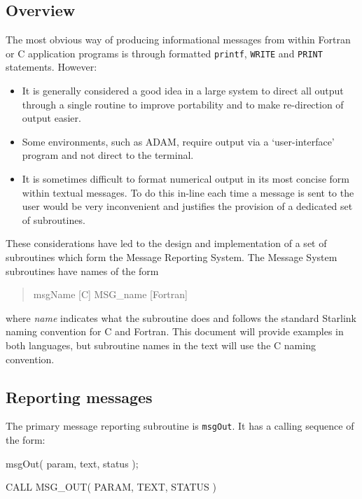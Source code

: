 \documentclass[twoside,11pt]{starlink}
\providecommand{\func}[1]{\texttt{#1}}
\providecommand{\farg}[1]{\textit{#1}}
\providecommand{\msgout}{\func{msgOut}}
\begin{document}
\subsection{Overview}

The most obvious way of producing informational messages from within
Fortran or C application programs is through formatted \func{printf},
\func{WRITE} and \func{PRINT}
statements.
However:
\begin{itemize}
\item It is generally considered a good idea in a large system to direct
all output through a single routine to improve portability and to make
re-direction of output easier.
\item Some environments, such as ADAM, require output via a `user-interface'
program and not direct to the terminal.
\item It is sometimes difficult to format numerical output in its most
concise form within textual messages.
To do this in-line each time a message is sent to the user would be very
inconvenient and justifies the provision of a dedicated set of subroutines.
\end{itemize}
These considerations have led to the design and implementation of a set of
subroutines which form the Message Reporting System.
The Message System subroutines have names of the form

\begin {quote}
\begin {small}
\begin{terminalv}
msgName      [C]
MSG_name     [Fortran]
\end{terminalv}
\end {small}
\end {quote}

where \farg{name} indicates what the subroutine does and follows the
standard Starlink naming convention for C and Fortran. This document will
provide examples in both languages, but subroutine names in the text
will use the C naming convention.

\subsection{Reporting messages}

The primary message reporting subroutine is \msgout.
It has a calling sequence of the form:

\begin {small}
\begin{terminalv}
      msgOut( param, text, status );

      CALL MSG_OUT( PARAM, TEXT, STATUS )
\end{terminalv}
\end {small}
\end{document}
